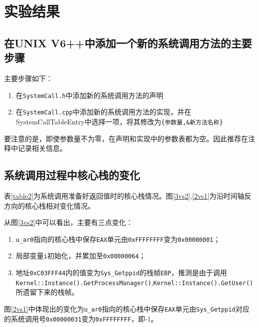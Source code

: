 \section{实验结果}
\subsection{在UNIX V6++中添加一个新的系统调用方法的主要步骤}
主要步骤如下：
\begin{enumerate}
    \item 在\texttt{SystemCall.h}中添加新的系统调用方法的声明
    \item 在\texttt{SystemCall.cpp}中添加新的系统调用方法的实现，并在SystemCallTableEntry中选择一项，将其修改为\verb|{参数量,&新方法名称}|
\end{enumerate}
要注意的是，即使参数量不为零，在声明和实现中的参数表都为空。因此推荐在注释中记录相关信息。

\subsection{系统调用过程中核心栈的变化}
表\ref{table2}为系统调用准备好返回值时的核心栈情况。图\ref{3vs2},\ref{2vs1}为沿时间轴反方向的核心栈相对变化情况。

从图\ref{3vs2}中可以看出，主要有三点变化：
\begin{enumerate}
    \item \texttt{u\_ar0}指向的核心栈中保存\texttt{EAX}单元由\texttt{0xFFFFFFFF}变为\texttt{0x00000001}；
    \item 局部变量\texttt{i}初始化，并累加至\texttt{0x00000064}；
    \item 地址\texttt{0xC03FFF44}内的值变为\texttt{Sys\_Getppid}的栈帧\texttt{EBP}，推测是由于调用\texttt{Kernel::Instance().GetProcessManager()},\texttt{Kernel::Instance().GetUser()}所遗留下来的栈帧。
\end{enumerate}

图\ref{2vs1}中体现出的变化为\texttt{u\_ar0}指向的核心栈中保存\texttt{EAX}单元由\texttt{Sys\_Getppid}对应的系统调用号\texttt{0x00000031}变为\texttt{0xFFFFFFFF}，即-1。

